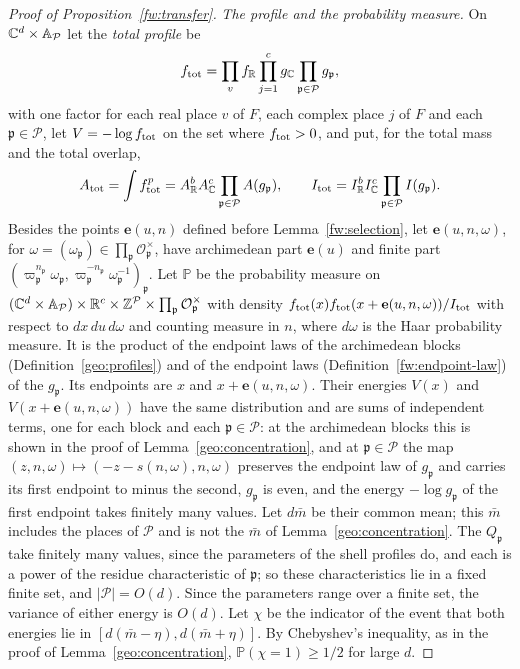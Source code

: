 \begin{proof}[Proof of Proposition~\ref{fw:transfer}]
\emph{The profile and the probability measure.} On $\mathbb C^d\times\mathbb
A_{\mathcal P}$ let the \emph{total profile} be
\[
 f_{\rm tot}=\prod_vf_\mathbb R\prod_{j=1}^cg_\mathbb C\prod_{\mathfrak p\in\mathcal
 P}g_{\mathfrak p},
\]
with one factor for each real place $v$ of $F$, each
complex place $j$ of $F$ and each $\mathfrak p\in\mathcal P$, let
$V=-\log f_{\rm tot}$ on the set where $f_{\rm tot}>0$, and put, for the
total mass and the total overlap,
\[
 A_{\rm tot}=\int f_{\rm tot}^p=A_\mathbb R^bA_\mathbb C^c\prod_{\mathfrak p\in\mathcal P}A(g_{\mathfrak p}),\qquad
 I_{\rm tot}=I_\mathbb R^bI_\mathbb C^c\prod_{\mathfrak p\in\mathcal P}I(g_{\mathfrak p}).
\]
Besides the points $\mathbf e(u,n)$ defined before Lemma~\ref{fw:selection},
let $\mathbf e(u,n,\omega)$, for $\omega=(\omega_{\mathfrak
p})\in\prod_{\mathfrak p}\mathcal O_{\mathfrak p}^\times$, have
archimedean part $\mathbf e(u)$ and finite part $(\varpi_{\mathfrak
p}^{n_{\mathfrak p}}\omega_{\mathfrak p},\varpi_{\mathfrak
p}^{-n_{\mathfrak p}}\omega_{\mathfrak p}^{-1})_{\mathfrak p}$. Let
$\mathbb P$ be the probability measure on $(\mathbb C^d\times\mathbb
A_{\mathcal P})\times\mathbb R^c\times\mathbb Z^{\mathcal P}\times\prod_{\mathfrak
p}\mathcal O_{\mathfrak p}^\times$ with density
$f_{\rm tot}(x)f_{\rm tot}(x+\mathbf e(u,n,\omega))/I_{\rm tot}$ with respect to $dx\,du\,d\omega$ and
counting measure in $n$, where $d\omega$ is the Haar probability
measure. It is the product of the endpoint laws of the archimedean
blocks (Definition~\ref{geo:profiles}) and of the endpoint laws
(Definition~\ref{fw:endpoint-law}) of the
$g_{\mathfrak p}$. Its endpoints are $x$ and $x+\mathbf e(u,n,\omega)$. Their
energies $V(x)$ and $V(x+\mathbf e(u,n,\omega))$ have the same distribution
and are sums of independent terms, one for each block and each
$\mathfrak p\in\mathcal P$: at the archimedean blocks this is shown in
the proof of Lemma~\ref{geo:concentration}, and at $\mathfrak
p\in\mathcal P$ the map $(z,n,\omega)\mapsto(-z-s(n,\omega),n,\omega)$
preserves the endpoint law of $g_{\mathfrak p}$ and carries its first
endpoint to minus the second, $g_{\mathfrak p}$ is even, and the energy
$-\log g_{\mathfrak p}$ of the first endpoint takes finitely many values.
Let $d\bar m$ be their common mean; this $\bar m$ includes the places of
$\mathcal P$ and is not the $\bar m$ of Lemma~\ref{geo:concentration}.
The $Q_{\mathfrak p}$ take finitely many values, since the parameters of
the shell profiles do, and each is a power of the residue characteristic
of $\mathfrak p$; so these characteristics lie in a fixed finite set,
and $|\mathcal P|=O(d)$. Since the parameters range over a finite set,
the variance of either energy is $O(d)$. Let $\chi$ be the indicator of
the event that both energies lie in $[d(\bar m-\eta),d(\bar m+\eta)]$.
By Chebyshev's inequality, as in the proof of
Lemma~\ref{geo:concentration}, $\mathbb P(\chi=1)\ge1/2$ for large $d$.


\end{proof}
